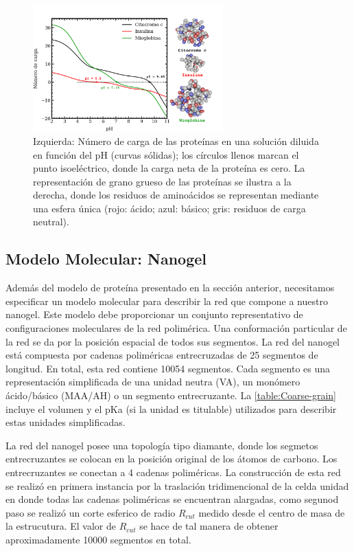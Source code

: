  \begin{figure}[!htb]
     \centering
     \includegraphics[width=0.65\textwidth]{Figures/graphs-gel2/protein-model.pdf}
     \caption{Izquierda: N\'umero de carga de las prote\'inas en una soluci\'on diluida en funci\'on del pH (curvas s\'olidas);
     	los c\'irculos llenos marcan el punto isoel\'ectrico,
     	donde la carga neta de la prote\'ina es cero.
     	La representaci\'on de grano grueso de las prote\'inas se ilustra a la derecha, donde los residuos de amino\'acidos se representan mediante una esfera \'unica (rojo: \'acido; azul: b\'asico; gris: residuos de carga neutral).}
     \label{fig:esf:protein-charge}
 \end{figure}



\subsection{Modelo Molecular: Nanogel}

Adem\'as del modelo de prote\'ina presentado en la secci\'on anterior, necesitamos especificar un modelo molecular para describir la red que compone a nuestro nanogel. Este modelo debe proporcionar un conjunto representativo de configuraciones moleculares de la red polim\'erica. Una conformaci\'on particular de la red se da por la posici\'on espacial de todos sus segmentos.
La red del nanogel est\'a compuesta por cadenas polim\'ericas entrecruzadas de 25 segmentos de longitud. En total, esta red contiene 10054 segmentos. Cada segmento es una representaci\'on simplificada de una unidad neutra (VA), un mon\'omero \'acido/b\'asico (MAA/AH) o un segmento entrecruzante. La \ref{table:Coarse-grain} incluye el volumen y el pKa (si la unidad es titulable) utilizados para describir estas unidades simplificadas.

La red del nanogel posee una topolog\'ia tipo diamante, donde los segmetos entrecruzantes se colocan en la posici\'on original de los \'atomos de carbono. Los entrecruzantes se conectan a 4 cadenas polim\'ericas. La construcci\'on de esta red se realiz\'o en primera instancia por la traslaci\'on tridimencional de la celda unidad en donde todas las cadenas polim\'ericas se encuentran alargadas, como segunod paso se realiz\'o un corte esferico de radio $R_{cut}$ medido desde el centro de masa de la estrucutura. El valor de $R_{cut}$ se hace de tal manera de obtener aproximadamente 10000 segmentos en total. 

